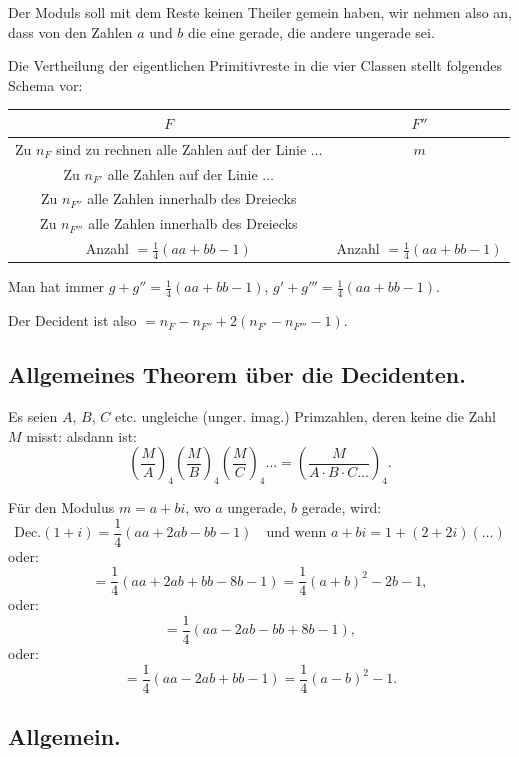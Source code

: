 \documentclass[12pt,a4paper]{article}
\begin{document}
Der Moduls soll mit dem Reste keinen Theiler gemein haben, wir nehmen also an, dass von
den Zahlen $a$ und $b$ die eine gerade, die andere ungerade sei.

Die Vertheilung der eigentlichen Primitivreste in die vier Classen stellt folgendes Schema vor:

\begin{center}
\begin{tabular}{c|c}
\hline
$F$ & $F''$ \\
\hline
Zu $n_F$ sind zu rechnen alle Zahlen auf der Linie $\ldots$ & $m$ \\
Zu $n_{F'}$ alle Zahlen auf der Linie $\ldots$ & \\
Zu $n_{F''}$ alle Zahlen innerhalb des Dreiecks & \\
Zu $n_{F'''}$ alle Zahlen innerhalb des Dreiecks & \\
\hline
Anzahl $= \frac{1}{4}(aa + bb - 1)$ & Anzahl $= \frac{1}{4}(aa + bb - 1)$ \\
\hline
\end{tabular}
\end{center}

Man hat immer $g + g'' = \frac{1}{4}(aa + bb - 1)$, $g' + g''' = \frac{1}{4}(aa + bb - 1)$.

Der Decident ist also $= n_F - n_{F''} + 2(n_{F'} - n_{F'''} - 1)$.


\subsection*{Allgemeines Theorem über die Decidenten.}

Es seien $A$, $B$, $C$ etc. ungleiche (unger. imag.) Primzahlen, deren keine die Zahl $M$ misst:
alsdann ist:
\[
\left(\frac{M}{A}\right)_4 \left(\frac{M}{B}\right)_4 \left(\frac{M}{C}\right)_4 \ldots = \left(\frac{M}{A \cdot B \cdot C \ldots}\right)_4.
\]

Für den Modulus $m = a + bi$, wo $a$ ungerade, $b$ gerade, wird:
\[
\text{Dec.}(1 + i) = \frac{1}{4}(aa + 2ab - bb - 1) \quad \text{und wenn } a + bi = 1 + (2 + 2i)(\ldots)
\]
oder:
\[
= \frac{1}{4}(aa + 2ab + bb - 8b - 1) = \frac{1}{4}(a + b)^2 - 2b - 1,
\]
oder:
\[
= \frac{1}{4}(aa - 2ab - bb + 8b - 1),
\]
oder:
\[
= \frac{1}{4}(aa - 2ab + bb - 1) = \frac{1}{4}(a - b)^2 - 1.
\]

\subsection*{Allgemein.}
\end{document}
